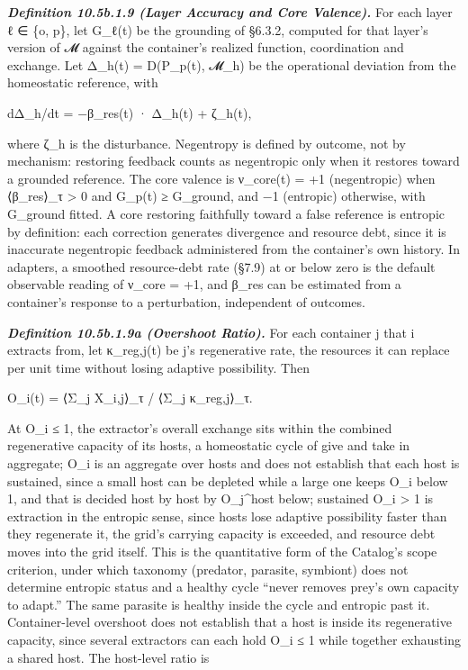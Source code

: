 \documentclass[
]{article}
\begin{document}
\emph{\textbf{Definition 10.5b.1.9 (Layer Accuracy and Core Valence).}}
For each layer ℓ ∈ \{o, p\}, let G\_ℓ(t) be the grounding of §6.3.2,
computed for that layer's version of 𝓜 against the container's realized
function, coordination and exchange. Let Δ\_h(t) = D(P\_p(t), 𝓜\_h) be
the operational deviation from the homeostatic reference, with

dΔ\_h/dt = −β\_res(t) · Δ\_h(t) + ζ\_h(t),

where ζ\_h is the disturbance. Negentropy is defined by outcome, not by
mechanism: restoring feedback counts as negentropic only when it
restores toward a grounded reference. The core valence is ν\_core(t) =
+1 (negentropic) when ⟨β\_res⟩\_τ \textgreater{} 0 and G\_p(t) ≥
G\_ground, and −1 (entropic) otherwise, with G\_ground fitted. A core
restoring faithfully toward a false reference is entropic by definition:
each correction generates divergence and resource debt, since it is
inaccurate negentropic feedback administered from the container's own
history. In adapters, a smoothed resource-debt rate (§7.9) at or below
zero is the default observable reading of ν\_core = +1, and β\_res can
be estimated from a container's response to a perturbation, independent
of outcomes.

\emph{\textbf{Definition 10.5b.1.9a (Overshoot Ratio).}} For each
container j that i extracts from, let κ\_reg,j(t) be j's regenerative
rate, the resources it can replace per unit time without losing adaptive
possibility. Then

O\_i(t) = ⟨Σ\_j X\_i,j⟩\_τ / ⟨Σ\_j κ\_reg,j⟩\_τ.

At O\_i ≤ 1, the extractor's overall exchange sits within the combined
regenerative capacity of its hosts, a homeostatic cycle of give and take
in aggregate; O\_i is an aggregate over hosts and does not establish
that each host is sustained, since a small host can be depleted while a
large one keeps O\_i below 1, and that is decided host by host by
O\_j\^{}host below; sustained O\_i \textgreater{} 1 is extraction in the
entropic sense, since hosts lose adaptive possibility faster than they
regenerate it, the grid's carrying capacity is exceeded, and resource
debt moves into the grid itself. This is the quantitative form of the
Catalog's scope criterion, under which taxonomy (predator, parasite,
symbiont) does not determine entropic status and a healthy cycle ``never
removes prey's own capacity to adapt.'' The same parasite is healthy
inside the cycle and entropic past it. Container-level overshoot does
not establish that a host is inside its regenerative capacity, since
several extractors can each hold O\_i ≤ 1 while together exhausting a
shared host. The host-level ratio is
\end{document}
